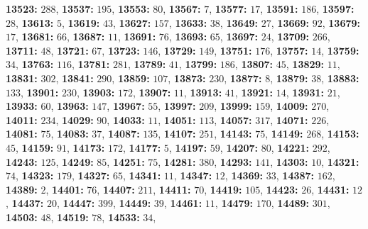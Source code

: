 \textsf{\bfseries 13523:} $288$, \textsf{\bfseries 13537:} $195$, \textsf{\bfseries 13553:} $80$, \textsf{\bfseries 13567:} $7$, \textsf{\bfseries 13577:} $17$, \textsf{\bfseries 13591:} $186$, \textsf{\bfseries 13597:} $28$, \textsf{\bfseries 13613:} $5$, \textsf{\bfseries 13619:} $43$, \textsf{\bfseries 13627:} $157$, \textsf{\bfseries 13633:} $38$, \textsf{\bfseries 13649:} $27$, \textsf{\bfseries 13669:} $92$, \textsf{\bfseries 13679:} $17$, \textsf{\bfseries 13681:} $66$, \textsf{\bfseries 13687:} $11$, \textsf{\bfseries 13691:} $76$, \textsf{\bfseries 13693:} $65$, \textsf{\bfseries 13697:} $24$, \textsf{\bfseries 13709:} $266$, \textsf{\bfseries 13711:} $48$, \textsf{\bfseries 13721:} $67$, \textsf{\bfseries 13723:} $146$, \textsf{\bfseries 13729:} $149$, \textsf{\bfseries 13751:} $176$, \textsf{\bfseries 13757:} $14$, \textsf{\bfseries 13759:} $34$, \textsf{\bfseries 13763:} $116$, \textsf{\bfseries 13781:} $281$, \textsf{\bfseries 13789:} $41$, \textsf{\bfseries 13799:} $186$, \textsf{\bfseries 13807:} $45$, \textsf{\bfseries 13829:} $11$, \textsf{\bfseries 13831:} $302$, \textsf{\bfseries 13841:} $290$, \textsf{\bfseries 13859:} $107$, \textsf{\bfseries 13873:} $230$, \textsf{\bfseries 13877:} $8$, \textsf{\bfseries 13879:} $38$, \textsf{\bfseries 13883:} $133$, \textsf{\bfseries 13901:} $230$, \textsf{\bfseries 13903:} $172$, \textsf{\bfseries 13907:} $11$, \textsf{\bfseries 13913:} $41$, \textsf{\bfseries 13921:} $14$, \textsf{\bfseries 13931:} $21$, \textsf{\bfseries 13933:} $60$, \textsf{\bfseries 13963:} $147$, \textsf{\bfseries 13967:} $55$, \textsf{\bfseries 13997:} $209$, \textsf{\bfseries 13999:} $159$, \textsf{\bfseries 14009:} $270$, \textsf{\bfseries 14011:} $234$, \textsf{\bfseries 14029:} $90$, \textsf{\bfseries 14033:} $11$, \textsf{\bfseries 14051:} $113$, \textsf{\bfseries 14057:} $317$, \textsf{\bfseries 14071:} $226$, \textsf{\bfseries 14081:} $75$, \textsf{\bfseries 14083:} $37$, \textsf{\bfseries 14087:} $135$, \textsf{\bfseries 14107:} $251$, \textsf{\bfseries 14143:} $75$, \textsf{\bfseries 14149:} $268$, \textsf{\bfseries 14153:} $45$, \textsf{\bfseries 14159:} $91$, \textsf{\bfseries 14173:} $172$, \textsf{\bfseries 14177:} $5$, \textsf{\bfseries 14197:} $59$, \textsf{\bfseries 14207:} $80$, \textsf{\bfseries 14221:} $292$, \textsf{\bfseries 14243:} $125$, \textsf{\bfseries 14249:} $85$, \textsf{\bfseries 14251:} $75$, \textsf{\bfseries 14281:} $380$, \textsf{\bfseries 14293:} $141$, \textsf{\bfseries 14303:} $10$, \textsf{\bfseries 14321:} $74$, \textsf{\bfseries 14323:} $179$, \textsf{\bfseries 14327:} $65$, \textsf{\bfseries 14341:} $11$, \textsf{\bfseries 14347:} $12$, \textsf{\bfseries 14369:} $33$, \textsf{\bfseries 14387:} $162$, \textsf{\bfseries 14389:} $2$, \textsf{\bfseries 14401:} $76$, \textsf{\bfseries 14407:} $211$, \textsf{\bfseries 14411:} $70$, \textsf{\bfseries 14419:} $105$, \textsf{\bfseries 14423:} $26$, \textsf{\bfseries 14431:} $12$, \textsf{\bfseries 14437:} $20$, \textsf{\bfseries 14447:} $399$, \textsf{\bfseries 14449:} $39$, \textsf{\bfseries 14461:} $11$, \textsf{\bfseries 14479:} $170$, \textsf{\bfseries 14489:} $301$, \textsf{\bfseries 14503:} $48$, \textsf{\bfseries 14519:} $78$, \textsf{\bfseries 14533:} $34$, 
